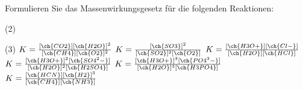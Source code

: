 \documentclass[DIV11]{scrartcl}
\begin{document}
\begin{question}[name=Massenwirkungsgesetz]
Formulieren Sie das Massenwirkungsgesetz für die folgenden Reaktionen:
\begin{tasks}(2)
 \task {}
 \task {}
 \task {}
 \task {}
 \task {}
 \task {}
\end{tasks}
\end{question}
\begin{solution}
\begin{tasks}(3)
 \task $K=\frac{[\ch{CO2}][\ch{H2O}]^2}{[\ch{CH4}][\ch{O2}]^2}$
 \task $K=\frac{[\ch{SO3}]^2}{[\ch{SO2}]^2[\ch{O2}]}$
 \task $K=\frac{[\ch{H3O+}][\ch{Cl-}]}{[\ch{H2O}][\ch{HCl}]}$
 \task $K=\frac{[\ch{H3O+}]^2[\ch{SO4^2-}]}{[\ch{H2O}]^2[\ch{H2SO4}]}$
 \task $K=\frac{[\ch{H3O+}]^3[\ch{PO4^3-}]}{[\ch{H2O}]^3[\ch{H3PO4}]}$
 \task $K=\frac{[\ch{HCN}][\ch{H2}]^3}{[\ch{CH4}][\ch{NH3}]}$
\end{tasks}
\end{solution}
\end{document}
